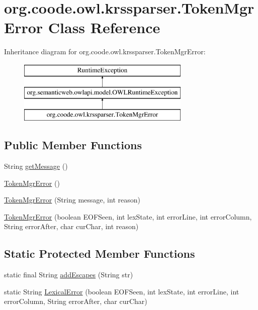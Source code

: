 \hypertarget{classorg_1_1coode_1_1owl_1_1krssparser_1_1_token_mgr_error}{\section{org.\-coode.\-owl.\-krssparser.\-Token\-Mgr\-Error Class Reference}
\label{classorg_1_1coode_1_1owl_1_1krssparser_1_1_token_mgr_error}
}
Inheritance diagram for org.\-coode.\-owl.\-krssparser.\-Token\-Mgr\-Error\-:\begin{figure}[H]
\begin{center}
\leavevmode
\includegraphics[height=3.000000cm]{classorg_1_1coode_1_1owl_1_1krssparser_1_1_token_mgr_error}
\end{center}
\end{figure}
\subsection*{Public Member Functions}
\begin{DoxyCompactItemize}
\item 
String \hyperlink{classorg_1_1coode_1_1owl_1_1krssparser_1_1_token_mgr_error_a6f069336853fe400e172c9ce0e54a709}{get\-Message} ()
\item 
\hyperlink{classorg_1_1coode_1_1owl_1_1krssparser_1_1_token_mgr_error_ab6e4de3ac9d75417602cf7ebc1c0d2a9}{Token\-Mgr\-Error} ()
\item 
\hyperlink{classorg_1_1coode_1_1owl_1_1krssparser_1_1_token_mgr_error_aedf9f3e48ecbbd5924d2a9efa19fb765}{Token\-Mgr\-Error} (String message, int reason)
\item 
\hyperlink{classorg_1_1coode_1_1owl_1_1krssparser_1_1_token_mgr_error_afe549c1406965377c2d0156d62db938b}{Token\-Mgr\-Error} (boolean E\-O\-F\-Seen, int lex\-State, int error\-Line, int error\-Column, String error\-After, char cur\-Char, int reason)
\end{DoxyCompactItemize}
\subsection*{Static Protected Member Functions}
\begin{DoxyCompactItemize}
\item 
static final String \hyperlink{classorg_1_1coode_1_1owl_1_1krssparser_1_1_token_mgr_error_a27b754573374cd335d8f18a47965b2ba}{add\-Escapes} (String str)
\item 
static String \hyperlink{classorg_1_1coode_1_1owl_1_1krssparser_1_1_token_mgr_error_acee38cdecfda49c3134e8e585bad8615}{Lexical\-Error} (boolean E\-O\-F\-Seen, int lex\-State, int error\-Line, int error\-Column, String error\-After, char cur\-Char)
\end{DoxyCompactItemize}
